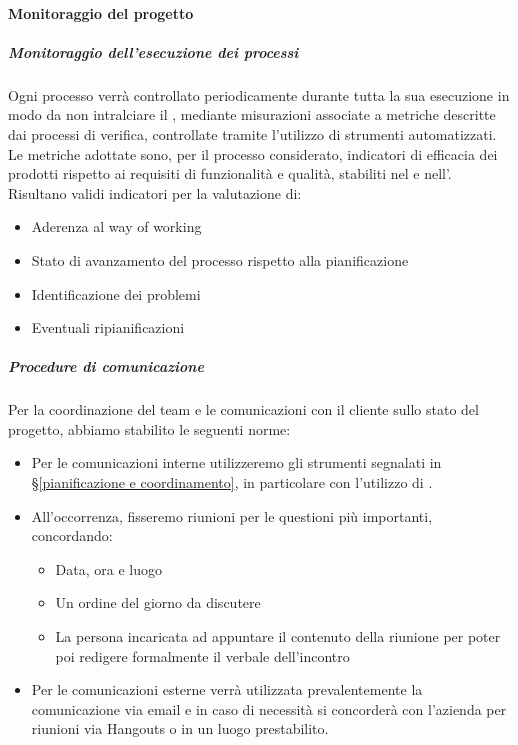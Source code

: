 			\paragraph{Monitoraggio del progetto}

			\subparagraph{Monitoraggio dell'esecuzione dei processi}
			Ogni processo verrà controllato periodicamente durante tutta la sua esecuzione in modo da non intralciare il ,
			mediante misurazioni associate a metriche descritte dai processi di verifica, controllate tramite l'utilizzo di strumenti automatizzati.
			Le metriche adottate sono, per il processo considerato, indicatori di efficacia dei prodotti rispetto ai requisiti di funzionalità e qualità,
			stabiliti nel \Doc{\PdQv} e nell'\Doc{\AdRv}.\\
			Risultano validi indicatori per la valutazione di:
			\begin{itemize}
				\item Aderenza al way of working
				\item Stato di avanzamento del processo rispetto alla pianificazione
				\item Identificazione dei problemi
				\item Eventuali ripianificazioni
			\end{itemize}

			\subparagraph{Procedure di comunicazione}
			Per la coordinazione del team e le comunicazioni con il cliente sullo stato del progetto, abbiamo stabilito le seguenti norme:
			\begin{itemize}
				\item Per le comunicazioni interne utilizzeremo gli strumenti segnalati in \S\ref{pianificazione e coordinamento},
					in particolare con l'utilizzo di .
				\item All'occorrenza, fisseremo riunioni per le questioni più importanti, concordando:
					\begin{itemize}
						\item Data, ora e luogo
						\item Un ordine del giorno da discutere
						\item La persona incaricata ad appuntare il contenuto della riunione per poter poi redigere formalmente il verbale dell'incontro
					\end{itemize}
				\item Per le comunicazioni esterne verrà utilizzata prevalentemente la comunicazione via email e in caso di necessità si concorderà con
				l'azienda per riunioni via Hangouts o in un luogo prestabilito. %
			\end{itemize}


